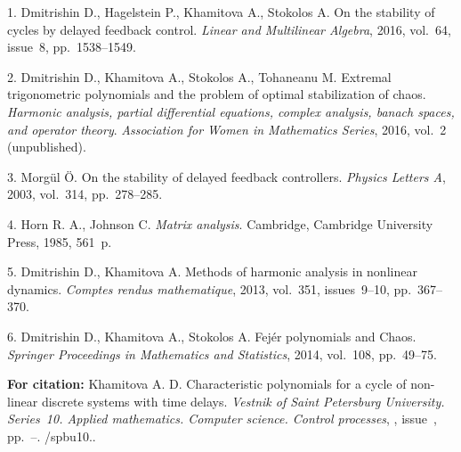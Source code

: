 

{\footnotesize

\vskip 3mm


\vskip 2mm



1.  Dmitrishin D.,  Hagelstein P.,  Khamitova A., Stokolos A. On
the stability of cycles by delayed feedback control. {\it Linear
and Multilinear Algebra}, 2016, vol.~64,  issue~8, pp.~1538--1549.

2.  Dmitrishin D., Khamitova A.,  Stokolos A., Tohaneanu M.
{Extremal trigonometric polynomials and the problem of optimal
stabilization of chaos}. {\it Harmonic analysis, partial
differential equations, complex analysis, banach spaces, and
operator theory}. {\it Association for Women in Mathematics
Series}, 2016, vol.~2 (unpublished).


3. Morg\"ul \"O. {On the stability of delayed feedback
controllers}. {\it Physics Letters A}, 2003, vol.~314,
pp.~278--285.

4. Horn R. A., Johnson C. {\it Matrix analysis}. Cambridge,
Cambridge University Press, 1985, 561~p.

5. Dmitrishin D.,  Khamitova A. Methods of harmonic analysis in
nonlinear dynamics. {\it Comptes rendus mathematique}, 2013,
vol.~351, issues~9--10, pp.~367--370.

6.  Dmitrishin D., Khamitova A.,  Stokolos A. Fej\'er polynomials
and Chaos. {\it Springer Proceedings in Mathematics and
Statistics}, 2014, vol.~108, pp.~49--75.



\vskip 2mm

{\bf For citation:}  Khamitova A. D. Characteristic polynomials
for a cycle of non-linear discrete systems with time delays. {\it
Vestnik of Saint Petersburg University. Series~10. Applied
mathematics. Computer science. Control processes}, \issueyear,
issue~\issuenum, pp.~\pageref{p10}--\pageref{p10e}.
\doivyp/spbu10.\issueyear.




}

